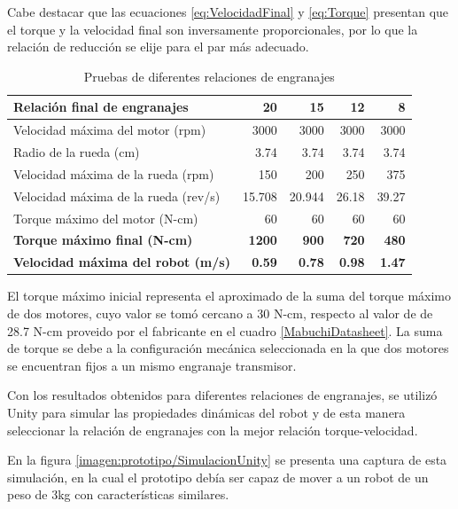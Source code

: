 Cabe destacar que las ecuaciones \ref{eq:VelocidadFinal} y \ref{eq:Torque} presentan que el torque y la velocidad final son inversamente proporcionales, por lo que la relación de reducción se elije para el par más adecuado.

\begin{table}[htbp]
	\caption{Pruebas de diferentes relaciones de engranajes}
	\centering
	\begin{tabular}{|l|r|r|r|r|}
		\hline
		\textbf{Relación final de engranajes} & \textbf{20} & \textbf{15} & \textbf{12} & \textbf{8} \\ \hline
		Velocidad máxima del motor (rpm) & 3000 & 3000 & 3000 & 3000 \\ \hline
		Radio de la rueda (cm) & 3.74 & 3.74 & 3.74 & 3.74 \\ \hline
		Velocidad máxima de la rueda (rpm) & 150 & 200 & 250 & 375 \\ \hline
		Velocidad máxima de la rueda (rev/s) & 15.708 & 20.944 & 26.18 & 39.27 \\ \hline
		Torque máximo del motor (N-cm) & 60 & 60 & 60 & 60 \\ \hline
		\textbf{Torque máximo final (N-cm)} & \textbf{1200} & \textbf{900} & \textbf{720} & \textbf{480} \\ \hline
		\textbf{Velocidad máxima del robot (m/s)} & \textbf{0.59} & \textbf{0.78} & \textbf{0.98} & \textbf{1.47} \\ \hline
	\end{tabular}
	\label{TablaPruebaEngranajes}
\end{table}

El torque máximo inicial representa el aproximado de la suma del torque máximo de dos motores, cuyo valor se tomó cercano a 30 N-cm, respecto al valor de de 28.7 N-cm proveido por el fabricante en el cuadro \ref{MabuchiDatasheet}. La suma de torque se debe a la configuración mecánica seleccionada en la que dos motores se encuentran fijos a un mismo engranaje transmisor.

Con los resultados obtenidos para diferentes relaciones de engranajes, se utilizó Unity para simular las propiedades dinámicas del robot y de esta manera seleccionar la relación de engranajes con la mejor relación torque-velocidad. 

En la figura \ref{imagen:prototipo/SimulacionUnity} se presenta una captura de esta simulación, en la cual el prototipo debía ser capaz de mover a un robot  de un peso de 3kg con características similares.



